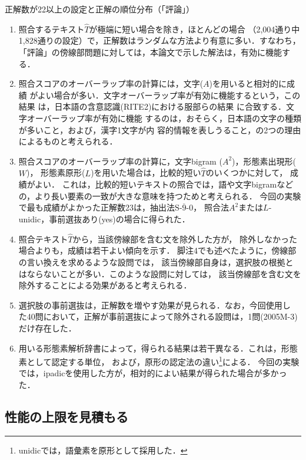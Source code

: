 \documentclass[japanese]{jnlp_1.4}
\begin{document}
\begin{table}[t]
\caption{正解数が22以上の設定と正解の順位分布（「評論」）}
\label{table2}

\end{table}

\begin{enumerate}
\item 
照合するテキスト$\widehat{T}$が極端に短い場合を除き，ほとんどの場合
（2,004通り中1,828通りの設定）で，正解数はランダムな方法より有意に多い．すなわち，
「評論」の傍線部問題に対しては，本論文で示した解法は，有効に機能する．
\item 
照合スコアのオーバーラップ率の計算には，文字($A$)を用いると相対的に成績
がよい場合が多い．文字オーバーラップ率が有効に機能するという，この結果
は，日本語の含意認識(RITE2)における服部らの結果
\cite{Hattori2013,SKL2013}に合致する．文字オーバーラップ率が有効に機能
するのは，おそらく，日本語の文字の種類が多いこと，および，漢字1文字が内
容的情報を表しうること，の2つの理由によるものと考えられる．
\item 
照合スコアのオーバーラップ率の計算に，文字bigram ($A^2$)，形態素出現形($W$)，
形態素原形($L$)を用いた場合は，比較的短い$\widehat{T}$のいくつかに対して，
成績がよい．
これは，比較的短いテキストの照合では，語や文字bigramなどの，より長い要素の一致が大きな意味を持つためと考えられる．
今回の実験で最も成績がよかった正解数23は，抽出法$\overline{\mbox{S-9-0}}$，
照合法$A^2$または$L$-unidic，事前選抜あり(yes)の場合に得られた．
\item 
照合テキスト$\widehat{T}$から，当該傍線部を含む文を除外した方が，
除外しなかった場合よりも，成績は若干よい傾向を示す．
脚注4でも述べたように，傍線部の言い換えを求めるような設問では，
該当傍線部自身は，選択肢の根拠とはならないことが多い．このような設問に対しては，
該当傍線部を含む文を除外することによる効果があると考えられる．
\item 
選択肢の事前選抜は，正解数を増やす効果が見られる．なお，今回使用し
た40問において，正解が事前選抜によって除外される設問は，1問(2005M-3)だけ存在した．
\item 
用いる形態素解析辞書によって，得られる結果は若干異なる．これは，形態素として認定する単位，
および，原形の認定法の違い\footnote{unidicでは，語彙素を原形として採用した．}による．
今回の実験では，ipadicを使用した方が，相対的によい結果が得られた場合が多かった．
\end{enumerate}


\subsection{性能の上限を見積もる}
\end{document}

